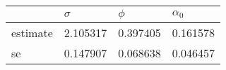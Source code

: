 \begin{tabular}{llll}
\toprule
{} &  $\sigma$ &    $\phi$ & $\alpha_0$ \\
\midrule
estimate &  2.105317 &  0.397405 &   0.161578 \\
se       &  0.147907 &  0.068638 &   0.046457 \\
\bottomrule
\end{tabular}
